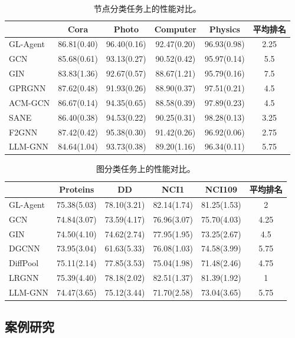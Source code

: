 \documentclass[11pt,UTF8,fontset=fandol]{ctexart}
\begin{document}
\begin{table}[H]\centering
\caption{节点分类任务上的性能对比。}
\label{tab:22}
\begin{tabular}{lccccc}
\toprule
 & Cora & Photo & Computer & Physics & 平均排名 \\
\midrule
GL-Agent & 86.81(0.40) & 96.40(0.16) & 92.47(0.20) & 96.93(0.98) & 2.25 \\
GCN & 85.68(0.61) & 93.13(0.27) & 90.52(0.42) & 95.97(0.14) & 5.5 \\
GIN & 83.83(1.36) & 92.67(0.57) & 88.67(1.21) & 95.79(0.16) & 7.5 \\
GPRGNN & 87.62(0.48) & 91.93(0.26) & 88.90(0.37) & 97.51(0.21) & 4.5 \\
ACM-GCN & 86.67(0.14) & 94.35(0.65) & 88.58(0.39) & 97.89(0.23) & 4.5 \\
SANE & 86.40(0.38) & 94.53(0.22) & 90.25(0.31) & 98.28(0.13) & 3.25 \\
F2GNN & 87.42(0.42) & 95.38(0.30) & 91.42(0.26) & 96.92(0.06) & 2.75 \\
LLM-GNN & 84.64(1.04) & 93.73(0.38) & 89.20(1.16) & 96.34(0.11) & 5.75 \\
\bottomrule
\end{tabular}
\end{table}

\begin{table}[H]\centering
\caption{图分类任务上的性能对比。}
\label{tab:23}
\begin{tabular}{lccccc}
\toprule
 & Proteins & DD & NCI1 & NCI109 & 平均排名 \\
\midrule
GL-Agent & 75.38(5.03) & 78.10(3.21) & 82.14(1.74) & 81.25(1.53) & 2 \\
GCN & 74.84(3.07) & 73.59(4.17) & 76.96(3.07) & 75.70(4.03) & 4.25 \\
GIN & 74.50(4.10) & 74.62(2.74) & 77.95(1.95) & 73.25(2.67) & 4.5 \\
DGCNN & 73.95(3.04) & 61.63(5.33) & 76.08(1.03) & 74.58(3.99) & 5.75 \\
DiffPool & 75.11(2.14) & 77.85(3.53) & 75.04(1.98) & 71.48(2.46) & 4.75 \\
LRGNN & 75.39(4.40) & 78.18(2.02) & 82.51(1.37) & 81.39(1.92) & 1 \\
LLM-GNN & 74.47(3.65) & 75.12(3.44) & 71.70(2.58) & 73.04(3.65) & 5.75 \\
\bottomrule
\end{tabular}
\end{table}

\subsection{案例研究}
\end{document}
